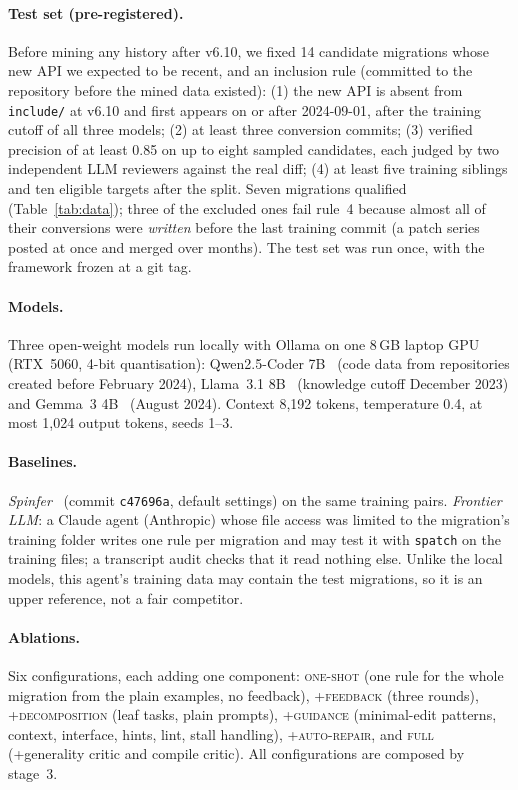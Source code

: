 \paragraph{Test set (pre-registered).} Before mining any history after v6.10, we fixed 14 candidate migrations whose
new API we expected to be recent, and an inclusion rule (committed to the repository before the mined data existed):
(1) the new API is absent from \texttt{include/} at v6.10 and first appears on or after 2024-09-01, after the
training cutoff of all three models; (2) at least three conversion commits; (3) verified precision of at least 0.85
on up to eight sampled candidates, each judged by two independent LLM reviewers against the real diff; (4) at least
five training siblings and ten eligible targets after the split. Seven migrations qualified
(Table~\ref{tab:data}); three of the excluded ones fail rule~4 because almost all of their conversions were
\emph{written} before the last training commit (a patch series posted at once and merged over months). The test set
was run once, with the framework frozen at a git tag.

\paragraph{Models.} Three open-weight models run locally with Ollama on one 8\,GB laptop GPU (RTX~5060, 4-bit
quantisation): Qwen2.5-Coder 7B~\cite{qwen25coder} (code data from repositories created before February 2024), Llama~3.1 8B~\cite{llama3}
(knowledge cutoff December 2023) and Gemma~3 4B~\cite{gemma3} (August 2024). Context 8{,}192 tokens, temperature 0.4, at most
1{,}024 output tokens, seeds 1--3.

\paragraph{Baselines.} \emph{Spinfer}~\cite{serrano2020spinfer} (commit \texttt{c47696a}, default settings) on the
same training pairs. \emph{Frontier LLM}: a Claude agent (Anthropic) whose file access was limited to the
migration's training folder writes one rule per migration and may test it with \texttt{spatch} on the training files;
a transcript audit checks that it read nothing else. Unlike the local models, this agent's training data may contain
the test migrations, so it is an upper reference, not a fair competitor.

\paragraph{Ablations.} Six configurations, each adding one component: \textsc{one-shot} (one rule for the whole
migration from the plain examples, no feedback), \textsc{+feedback} (three rounds), \textsc{+decomposition} (leaf
tasks, plain prompts), \textsc{+guidance} (minimal-edit patterns, context, interface, hints, lint, stall handling),
\textsc{+auto-repair}, and \textsc{full} (+generality critic and compile critic). All configurations are composed by
stage~3.

